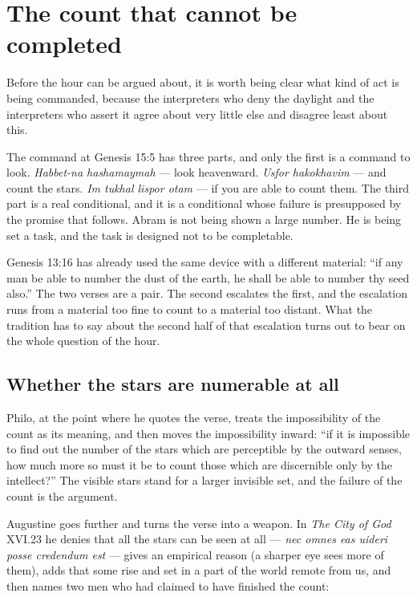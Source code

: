 \section{The count that cannot be completed}

Before the hour can be argued about, it is worth being clear what kind of act is
being commanded, because the interpreters who deny the daylight and the
interpreters who assert it agree about very little else and disagree least about
this.

The command at Genesis 15:5 has three parts, and only the first is a command to
look. \textit{Habbet-na hashamaymah} --- look heavenward. \textit{Usfor
hakokhavim} --- and count the stars. \textit{Im tukhal lispor otam} --- if you
are able to count them. The third part is a real conditional, and it is a
conditional whose failure is presupposed by the promise that follows. Abram is
not being shown a large number. He is being set a task, and the task is designed
not to be completable.

Genesis 13:16 has already used the same device with a different material: ``if
any man be able to number the dust of the earth, he shall be able to number thy
seed also.'' The two verses are a pair. The second escalates the first, and the
escalation runs from a material too fine to count to a material too distant. What
the tradition has to say about the second half of that escalation turns out to
bear on the whole question of the hour.

\subsection{Whether the stars are numerable at all}

Philo, at the point where he quotes the verse, treats the impossibility of the
count as its meaning, and then moves the impossibility inward: ``if it is
impossible to find out the number of the stars which are perceptible by the
outward senses, how much more so must it be to count those which are discernible
only by the intellect?'' The visible stars stand for a larger invisible set, and
the failure of the count is the argument.

Augustine goes further and turns the verse into a weapon. In \textit{The City of
God} XVI.23 he denies that all the stars can be seen at all --- \textit{nec omnes
eas uideri posse credendum est} --- gives an empirical reason (a sharper eye sees
more of them), adds that some rise and set in a part of the world remote from us,
and then names two men who had claimed to have finished the count:

